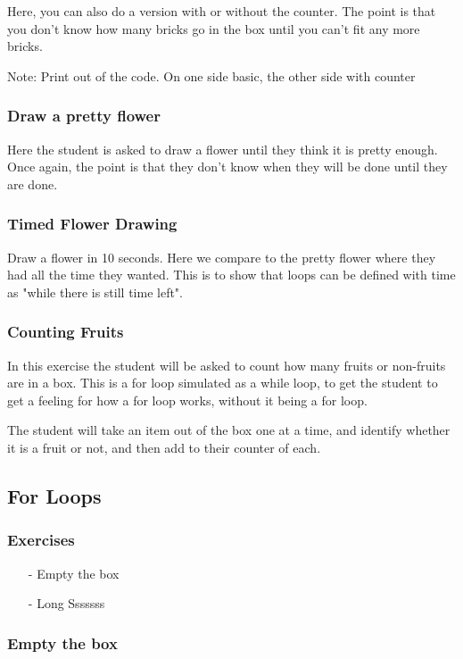 Here, you can also do a version with or without the counter. The point is that you don't know how many bricks go in the box until you can't fit any more bricks. 


Note: Print out of the code. On one side basic, the other side with counter

\subsubsection{Draw a pretty flower}


Here the student is asked to draw a flower until they think it is pretty enough. Once again, the point is that they don't know when they will be done until they are done. 

\subsubsection{Timed Flower Drawing}
Draw a flower in 10 seconds. Here we compare to the pretty flower where they had all the time they wanted. This is to show that loops can be defined with time as "while there is still time left". 


\subsubsection{Counting Fruits}

In this exercise the student will be asked to count how many fruits or non-fruits are in a box. This is a for loop simulated as a while loop, to get the student to get a feeling for how a for loop works, without it being a for loop. 

The student will take an item out of the box one at a time, and identify whether it is a fruit or not, and then add to their counter of each. 

\subsection{For Loops}

\subsubsection{Exercises}
\begin{itemize}
    \item [-] Empty the box
    \item [-] Long Sssssss
\end{itemize}


\subsubsection{Empty the box}

